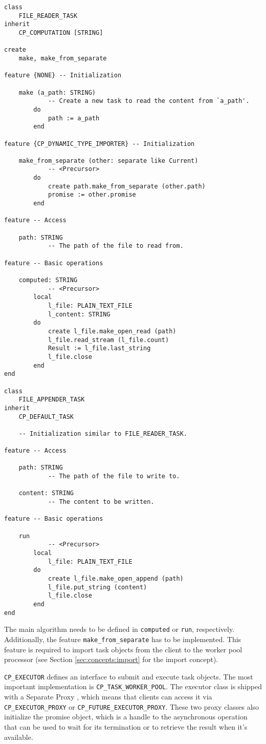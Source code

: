 \begin{lstlisting}[language=OOSC2Eiffel, label={code:file-tasks}, captionpos=b, caption={The file reader and appender classes.}]
class
	FILE_READER_TASK
inherit
	CP_COMPUTATION [STRING]

create
	make, make_from_separate

feature {NONE} -- Initialization

	make (a_path: STRING)
			-- Create a new task to read the content from `a_path'.
		do
			path := a_path
		end

feature {CP_DYNAMIC_TYPE_IMPORTER} -- Initialization

	make_from_separate (other: separate like Current)
			-- <Precursor>
		do
			create path.make_from_separate (other.path)
			promise := other.promise
		end

feature -- Access

	path: STRING
			-- The path of the file to read from.

feature -- Basic operations

	computed: STRING
			-- <Precursor>
		local
			l_file: PLAIN_TEXT_FILE
			l_content: STRING
		do
			create l_file.make_open_read (path)
			l_file.read_stream (l_file.count)
			Result := l_file.last_string
			l_file.close
		end
end

class
	FILE_APPENDER_TASK
inherit
	CP_DEFAULT_TASK

    -- Initialization similar to FILE_READER_TASK.
	
feature -- Access

	path: STRING
			-- The path of the file to write to.

	content: STRING
			-- The content to be written.

feature -- Basic operations

	run
			-- <Precursor>
		local
			l_file: PLAIN_TEXT_FILE
		do
			create l_file.make_open_append (path)
			l_file.put_string (content)
			l_file.close
		end
end
\end{lstlisting}

The main algorithm needs to be defined in \lstinline!computed! or \lstinline!run!, respectively.
Additionally, the feature \lstinline!make_from_separate! has to be implemented.
This feature is required to import task objects from the client to the worker pool processor (see Section \ref{sec:concepts:import} for the import concept).

\lstinline!CP_EXECUTOR! defines an interface to submit and execute task objects.
The most important implementation is \lstinline!CP_TASK_WORKER_POOL!.
The executor class is shipped with a Separate Proxy , which means that clients can access it via \lstinline!CP_EXECUTOR_PROXY! or \lstinline!CP_FUTURE_EXECUTOR_PROXY!.
These two proxy classes also initialize the promise object, which is a handle to the asynchronous operation that can be used to wait for its termination or to retrieve the result when it's available.

